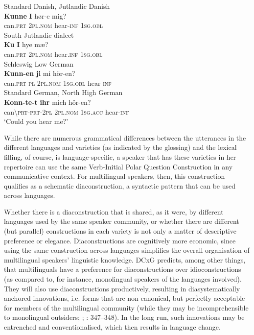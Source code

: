 \documentclass[output=paper]{langsci/langscibook}
\begin{document}
 
\ea\label{ex:hoeder:1}
	\ea \label{ex:hoeder:1a}
	Standard Danish, Jutlandic Danish\\
	\gll \textbf{Kunne} \textbf{I} hør-e mig?\\
     	can.\textsc{prt} \textsc{2pl.nom} hear-\textsc{inf} 1\textsc{sg.obl}\\
	
	\ex\label{ex:hoeder:1b}
		South Jutlandic dialect\\
		\gll \textbf{Ku} \textbf{I} hye mæ?\\
     	can.\textsc{prt} \textsc{2pl.nom} hear.\textsc{inf} 1\textsc{sg.obl}\\
     	
	\ex\label{ex:hoeder:1c}
	 Schleswig Low German\\
	\gll \textbf{Kunn-en} \textbf{ji} mi hör-en?\\
     can.\textsc{prt-pl} 2\textsc{pl.nom} 1\textsc{sg.obl} hear\textsc{{}-inf}\\
     
	\ex\label{ex:hoeder:1d}
	Standard German, North High German\\
	\gll \textbf{Konn-te-t} \textbf{ihr} mich hör-en?\\
     can{\textbackslash}\textsc{prt-prt-}2\textsc{pl} 2\textsc{pl.nom} 1\textsc{sg.acc} hear-\textsc{inf}\\
	\glt `Could you hear me?'
\z
\z

While there are numerous grammatical differences between the utterances in the different languages and varieties (as indicated by the glossing) and the lexical filling, of course, is language-specific, a speaker that has these varieties in her repertoire can use the same Verb-Initial Polar Question Construction in any communicative context. For multilingual speakers, then, this construction qualifies as a schematic diaconstruction, a syntactic pattern that can be used across languages.

Whether there is a diaconstruction that is shared, as it were, by different languages used by the same speaker community, or whether there are different (but parallel) constructions in each variety is not only a matter of descriptive preference or elegance. Diaconstructions are cognitively more economic, since using the same construction across languages simplifies the overall organisation of multilingual speakers’ linguistic knowledge. DCxG predicts, among other things, that multilinguals have a preference for diaconstructions over idioconstructions (as compared to, for instance, monolingual speakers of the languages involved). They will also use diaconstructions productively, resulting in diasystematically anchored innovations, i.e. forms that are non-canonical, but perfectly acceptable for members of the multilingual community (while they may be incomprehensible to monolingual outsiders; \citealt[59]{Hoder.2018}; \citeyear{Hoder.2019b}: 347--348). In the long run, such innovations may be entrenched and conventionalised, which then results in language change.
\end{document}
